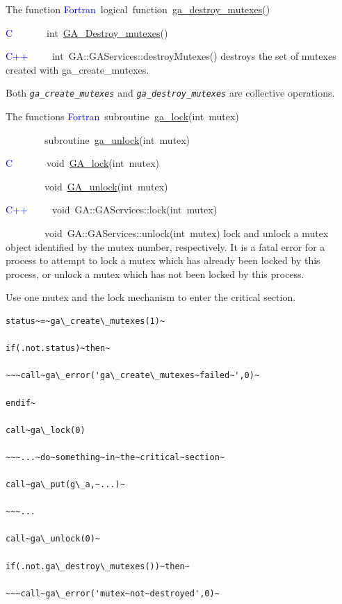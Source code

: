 The function
\textcolor{blue}{Fortran}~logical~function~\href{https://hpc.pnl.gov/globalarrays/api/f_op_api.html#DESTROY_MUTEXES}{ga\_{}destroy\_{}mutexes}()~

\textcolor{blue}{C}~~~~~~~int~\href{https://hpc.pnl.gov/globalarrays/api/c_op_api.html#DESTROY_MUTEXES}{GA\_{}Destroy\_{}mutexes}()

\textcolor{blue}{C++}~~~~~int~GA::GAServices::destroyMutexes()
destroys the set of mutexes created with ga\_create\_mutexes.

Both \texttt{\emph{ga\_create\_mutexes}} and \texttt{\emph{ga\_destroy\_mutexes}}
are collective operations.

The functions
\textcolor{blue}{Fortran}~subroutine~\href{https://hpc.pnl.gov/globalarrays/api/f_op_api.html\#LOCK}{ga\_{}lock}(int~mutex)~

~~~~~~~~subroutine~\href{https://hpc.pnl.gov/globalarrays/api/f_op_api.html#UNLOCK}{ga\_{}unlock}(int~mutex)~

\textcolor{blue}{C}~~~~~~~void~\href{https://hpc.pnl.gov/globalarrays/api/c_op_api.html#LOCK}{GA\_{}lock}(int~mutex)~

~~~~~~~~void~\href{https://hpc.pnl.gov/globalarrays/api/c_op_api.html#UNLOCK}{GA\_{}unlock}(int~mutex)~

\textcolor{blue}{C++}~~~~~void~GA::GAServices::lock(int~mutex)~

~~~~~~~~void~GA::GAServices::unlock(int~mutex)
lock and unlock a mutex object identified by the mutex number, respectively.
It is a fatal error for a process to attempt to lock a mutex which
has already been locked by this process, or unlock a mutex which has
not been locked by this process.

\emph{}\underbar{ }\emph{}\underbar{:}

Use one mutex and the lock mechanism to enter the critical section.
\begin{verbatim}
status~=~ga\_create\_mutexes(1)~

if(.not.status)~then~

~~~call~ga\_error('ga\_create\_mutexes~failed~',0)~

endif~

call~ga\_lock(0)

~~~...~do~something~in~the~critical~section~

call~ga\_put(g\_a,~...)~

~~~...

call~ga\_unlock(0)~

if(.not.ga\_destroy\_mutexes())~then~

~~~call~ga\_error('mutex~not~destroyed',0)~
\end{verbatim}

